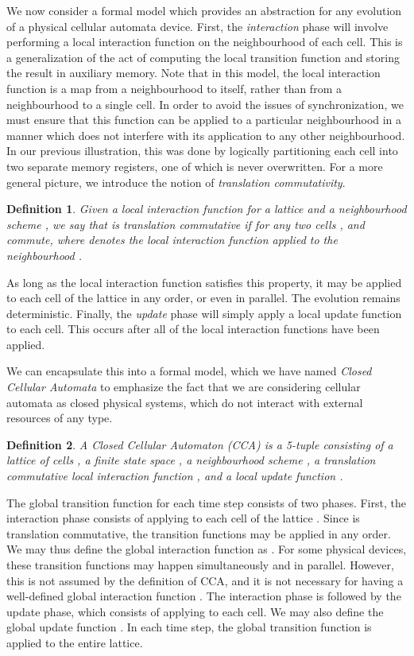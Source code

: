 \documentclass{jca}
\newtheorem{definition}{Definition}
\begin{document}
We now consider a formal model which provides an abstraction for any evolution of a physical cellular automata device.
First, the \emph{interaction} phase will involve performing a local interaction function  on the neighbourhood of each cell.
This is a generalization of the act of computing the local transition function and storing the result in auxiliary memory.
Note that in this model, the local interaction function is a map from a neighbourhood to itself, rather than from a neighbourhood to a single cell.
In order to avoid the issues of synchronization, we must ensure that this function can be applied to a particular neighbourhood in a manner which does not interfere with its application to any other neighbourhood.
In our previous illustration, this was done by logically partitioning each cell into two separate memory registers, one of which is never overwritten.
For a more general picture, we introduce the notion of \emph{translation commutativity}.
\begin{definition}
Given a local interaction function  for a lattice  and a neighbourhood scheme , we say that  is translation commutative if for any two cells ,  and  commute, where  denotes the local interaction function  applied to the neighbourhood .
\end{definition}
As long as the local interaction function satisfies this property, it may be applied to each cell of the lattice in any order, or even in parallel.
The evolution remains deterministic.
Finally, the \emph{update} phase will simply apply a local update function  to each cell.
This occurs after all of the local interaction functions have been applied.

We can encapsulate this into a formal model, which we have named \emph{Closed Cellular Automata} to emphasize the fact that we are considering cellular automata as closed physical systems, which do not interact with external resources of any type.
\begin{definition}
A Closed Cellular Automaton (CCA) is a 5-tuple  consisting of a lattice of cells , a finite state space , a neighbourhood scheme , a translation commutative local interaction function , and a local update function .
\end{definition}
The global transition function for each time step consists of two phases.
First, the interaction phase consists of applying  to each cell of the lattice .
Since  is translation commutative, the transition functions may be applied in any order.
We may thus define the global interaction function as .
For some physical devices,  these transition functions may happen simultaneously and in parallel.
However, this is not assumed by the definition of CCA, and it is not necessary for having a well-defined global interaction function .
The interaction phase is followed by the update phase, which consists of applying  to each cell.
We may also define the global update function .
In each time step, the global transition function  is applied to the entire lattice.
\end{document}
